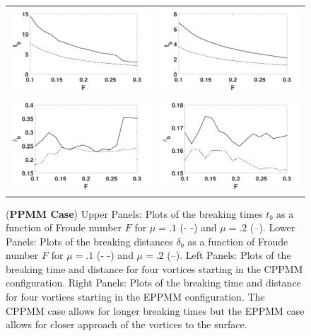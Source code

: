 \documentclass[a4paper,11pt]{article}
\begin{document}
\begin{figure}[!h]
\centering
\begin{tabular}{cc}
\includegraphics[width=.5\textwidth]{froude_comp_ppmm} & \includegraphics[width=.5\textwidth]{froude_comp_ppmm_sym}\\
\includegraphics[width=.5\textwidth]{zmb_ppmm} & \includegraphics[width=.5\textwidth]{zmb_ppmm_sym}
\end{tabular}
\caption{\small ({\bf PPMM Case}) Upper Panels: Plots of the breaking times $t_{b}$ as a function of Froude number $F$ for $\mu=.1$ (- -) and $\mu=.2$ (--).  Lower Panels: Plots of the breaking distances $\delta_{b}$ as a function of Froude number $F$ for $\mu=.1$ (- -) and $\mu=.2$ (--). Left Panels: Plots of the breaking time and distance for four vortices starting in the CPPMM configuration.  Right Panels: Plots of the breaking time and distance for four vortices starting in the EPPMM configuration.  The CPPMM case allows for longer breaking times but the EPPMM case allows for closer approach of the vortices to the surface.}
\label{fig:froudecomp_ppmm}
\end{figure}
\end{document}

